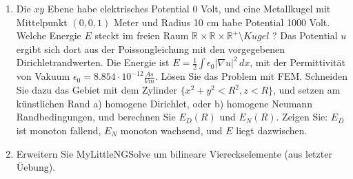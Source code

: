 \documentclass[11pt,a4paper]{report}
\newcommand{\R}[1]{\mathbb{R}^{#1}}
\begin{document}
\begin{enumerate}
\item
Die $xy$ Ebene habe elektrisches Potential 0 Volt, und eine Metallkugel
mit Mittelpunkt $(0,0,1)$ Meter und Radius 10 cm habe Potential 1000
Volt. Welche Energie $E$ steckt im freien Raum $\R{} \times \R{} \times
\R{+} \setminus Kugel$ ? Das Potential $u$ ergibt sich dort aus der
Poissongleichung mit den vorgegebenen Dirichletrandwerten. Die Energie
ist $E = \frac12\int
\epsilon_0 | \nabla u |^2 \, dx$, mit der Permittivit\"at von Vakuum
$\epsilon_0 = 8.854 \cdot 10^{-12} \frac{As} {Vm}$. L\"osen Sie das Problem mit FEM. Schneiden
Sie dazu das Gebiet mit dem Zylinder $\{ x^2 + y^2 < R^2, z < R \}$, und
setzen am k\"unstlichen Rand a) homogene Dirichlet, oder b) homogene
Neumann Randbedingungen, und berechnen Sie $E_D(R)$ und $E_N(R)$. 
Zeigen Sie: $E_D$ ist monoton fallend, $E_N$ monoton wachsend, und $E$
liegt dazwischen.

\item Erweitern Sie MyLittleNGSolve um bilineare
  Viereckselemente (aus letzter \"Uebung).

\end{enumerate}
\end{document}
